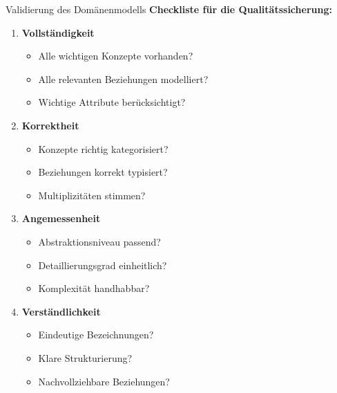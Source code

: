 \begin{KR}{Validierung des Domänenmodells}
\textbf{Checkliste für die Qualitätssicherung:}
\begin{enumerate}
    \item \textbf{Vollständigkeit}
    \begin{itemize}
        \item Alle wichtigen Konzepte vorhanden?
        \item Alle relevanten Beziehungen modelliert?
        \item Wichtige Attribute berücksichtigt?
    \end{itemize}

    \item \textbf{Korrektheit}
    \begin{itemize}
        \item Konzepte richtig kategorisiert?
        \item Beziehungen korrekt typisiert?
        \item Multiplizitäten stimmen?
    \end{itemize}

    \item \textbf{Angemessenheit}
    \begin{itemize}
        \item Abstraktionsniveau passend?
        \item Detaillierungsgrad einheitlich?
        \item Komplexität handhabbar?
    \end{itemize}

    \item \textbf{Verständlichkeit}
    \begin{itemize}
        \item Eindeutige Bezeichnungen?
        \item Klare Strukturierung?
        \item Nachvollziehbare Beziehungen?
    \end{itemize}
\end{enumerate}
\end{KR}

